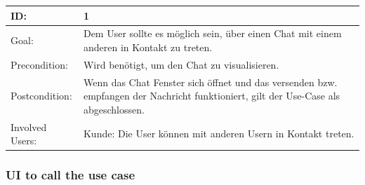 \documentclass[12pt]{article}
\theoremstyle{definition}
\begin{document}
\begin{tabular}{|p{.2\linewidth}|p{.65\linewidth}|}
\hline 
ID: & 1 \\ \hline
Goal: & Dem User sollte es möglich sein, über einen Chat mit einem anderen in Kontakt zu treten. \\ \hline
Precondition: & Wird benötigt, um den Chat zu visualisieren. \\ \hline
Postcondition: & Wenn das Chat Fenster sich öffnet und das versenden bzw. empfangen der Nachricht funktioniert, gilt der Use-Case als abgeschlossen. \\ \hline
Involved Users: &Kunde: Die User können mit anderen Usern in Kontakt treten. \\ \hline
\end{tabular}

\subsubsection{UI to call the use case}
\end{document}
